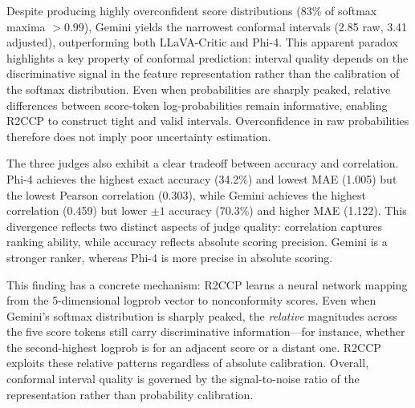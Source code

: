 \documentclass{article}
\begin{document}
Despite producing highly overconfident score distributions (83\% of softmax maxima $> 0.99$), Gemini yields the narrowest conformal intervals (2.85 raw, 3.41 adjusted), outperforming both LLaVA-Critic and Phi-4. This apparent paradox highlights a key property of conformal prediction: interval quality depends on the discriminative signal in the feature representation rather than the calibration of the softmax distribution. Even when probabilities are sharply peaked, relative differences between score-token log-probabilities remain informative, enabling R2CCP to construct tight and valid intervals. Overconfidence in raw probabilities therefore does not imply poor uncertainty estimation.

The three judges also exhibit a clear tradeoff between accuracy and correlation. Phi-4 achieves the highest exact accuracy (34.2\%) and lowest MAE (1.005) but the lowest Pearson correlation (0.303), while Gemini achieves the highest correlation (0.459) but lower $\pm 1$ accuracy (70.3\%) and higher MAE (1.122). This divergence reflects two distinct aspects of judge quality: correlation captures ranking ability, while accuracy reflects absolute scoring precision. Gemini is a stronger ranker, whereas Phi-4 is more precise in absolute scoring.

This finding has a concrete mechanism: R2CCP learns a neural network mapping from the 5-dimensional logprob vector to nonconformity scores. Even when Gemini's softmax distribution is sharply peaked, the \emph{relative} magnitudes across the five score tokens still carry discriminative information---for instance, whether the second-highest logprob is for an adjacent score or a distant one. R2CCP exploits these relative patterns regardless of absolute calibration. Overall, conformal interval quality is governed by the signal-to-noise ratio of the representation rather than probability calibration.
\end{document}
